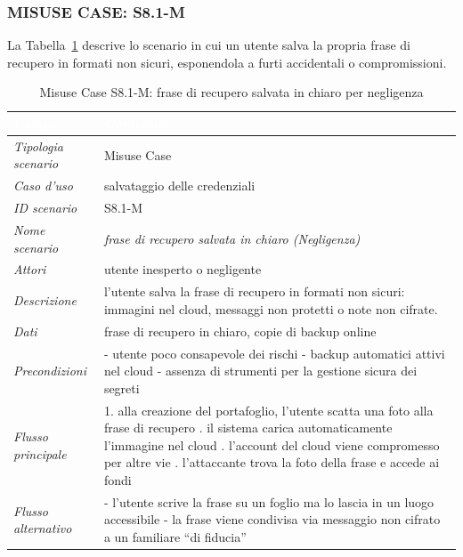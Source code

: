 \subsubsection*{MISUSE CASE: S8.1-M}
La Tabella~\ref{tab:s81m} descrive lo scenario in cui un utente salva la propria frase di recupero in formati non sicuri, esponendola a furti accidentali o compromissioni.
\begin{longtable}{| >{\columncolor{misuseCol}}p{} | p{} |}
\caption{Misuse Case S8.1-M: frase di recupero salvata in chiaro per negligenza}\label{tab:s81m}\\
\hline
\rowcolor{misuseHeader} \textcolor{white}{\textit{Campo}} & \textcolor{white}{\textit{Contenuto}} \\
\hline
\textit{Tipologia scenario} & Misuse Case \\
\hline
\textit{Caso d'uso} & salvataggio delle credenziali \\
\hline
\textit{ID scenario} & S8.1-M \\
\hline
\textit{Nome scenario} & \textit{frase di recupero salvata in chiaro (Negligenza)} \\
\hline
\textit{Attori} & utente inesperto o negligente \\
\hline
\textit{Descrizione} & l'utente salva la frase di recupero in formati non sicuri: immagini nel cloud, messaggi non protetti o note non cifrate. \\
\hline
\textit{Dati} & frase di recupero in chiaro, copie di backup online \\
\hline
\textit{Precondizioni} & - utente poco consapevole dei rischi \newline - backup automatici attivi nel cloud \newline - assenza di strumenti per la gestione sicura dei segreti \\
\hline
\textit{Flusso principale} & 1. alla creazione del portafoglio, l'utente scatta una foto alla frase di recupero \newline 2. il sistema carica automaticamente l'immagine nel cloud \newline 3. l'account del cloud viene compromesso per altre vie \newline 4. l'attaccante trova la foto della frase e accede ai fondi \\
\hline
\textit{Flusso alternativo} & - l'utente scrive la frase su un foglio ma lo lascia in un luogo accessibile \newline - la frase viene condivisa via messaggio non cifrato a un familiare ``di fiducia'' \\

\end{longtable}

